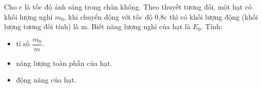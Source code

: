 \begin{vidu}
	Cho c là tốc độ ánh sáng trong chân không. Theo thuyết tương đối, một hạt có khối lượng nghỉ $m_0$, khi chuyển động với tốc độ 0,8c thì có khối lượng động (khối lượng tương đối tính) là m. Biết năng lượng nghỉ của hạt là $E_0$. Tính:
	\begin{itemize}
		\item[a)] tỉ số $\dfrac {m_0}{m}$. 
		\item[b)] năng lượng toàn phần của hạt.
		\item[c)] động năng của hạt.
	\end{itemize}
\end{vidu}

